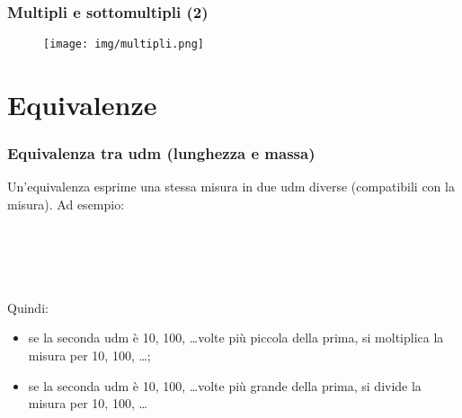 \documentclass[]{beamer}
\begin{document}
\begin{frame}
\frametitle{Multipli e sottomultipli (2)}
\begin{figure}
  \texttt{[image: img/multipli.png]}
\end{figure}
\end{frame}

\section{Equivalenze}

\begin{frame}
\frametitle{Equivalenza tra udm (lunghezza e massa)}
Un'equivalenza esprime una stessa misura in due udm diverse (compatibili con la misura).{\pause} Ad esempio:

~

\begin{columns}
\end{columns}

~\pause

Quindi:
\begin{itemize}
  \item \alert<3>{se la seconda udm è 10, 100, \ldots volte più piccola della prima, si moltiplica la misura per 10, 100, \ldots};
  \item \alert<4>{se la seconda udm è 10, 100, \ldots volte più grande della prima, si divide la misura per 10, 100, \ldots}
\end{itemize}
\end{frame}
\end{document}
